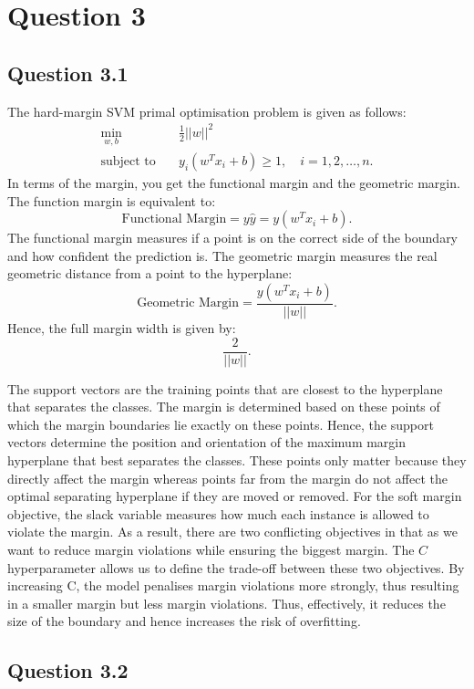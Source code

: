 \section{Question 3}

\subsection{Question 3.1}

 The hard-margin SVM primal optimisation problem is given as follows:
\[
\begin{aligned}
\min_{w,b} \quad & \frac{1}{2} ||w||^2\\
\text{subject to} \quad & y_i(w^T x_i + b) \geq 1, \quad i = 1,2,\ldots,n.
\end{aligned}
\]
In terms of the margin, you get the functional margin and the geometric margin. The function margin
is equivalent to:
\[\text{Functional Margin} = y\hat{y} = y(w^Tx_i + b).\]
The functional margin measures if a point is on the correct side of the boundary and how confident the
prediction is. The geometric margin measures the real geometric distance from a point to the hyperplane:
\[\text{Geometric Margin} = \frac{y(w^Tx_i + b)}{||w||}.\]
Hence, the full margin width is given by:
\[\frac{2}{||w||}.\]

 The support vectors are the training points that are closest to the hyperplane that separates
the classes. The margin is determined based on these points of which the margin boundaries lie
exactly on these points. Hence, the support vectors determine the position and orientation of the
maximum margin hyperplane that best separates the classes. These points only matter because
they directly affect the margin whereas points far from the margin do not affect the optimal 
separating hyperplane if they are moved or removed.
\newpage
{} For the soft margin objective, the slack variable measures how much each instance is allowed
to violate the margin. As a result, there are two conflicting objectives in that as we want
to reduce margin violations while ensuring the biggest margin. The $C$ hyperparameter allows
us to define the trade-off between these two objectives. By increasing C, the model 
penalises margin violations more strongly, thus resulting in a smaller margin but less
margin violations. Thus, effectively, it reduces the size of the boundary and hence increases
the risk of overfitting.

\subsection{Question 3.2}



